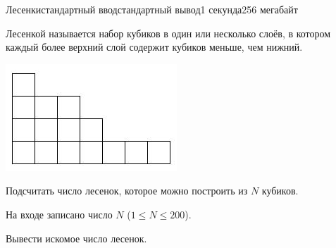 \begin{problem}{Лесенки}{стандартный ввод}{стандартный вывод}{1 секунда}{256 мегабайт}

Лесенкой называется набор кубиков в один или несколько слоёв, в котором
каждый более верхний слой содержит кубиков меньше, чем нижний.

\includegraphics[scale=1,natwidth=243, natheight=152]{lesenki_image_ru_1.jpg}

Подсчитать число лесенок, которое можно построить из $N$ кубиков.


\InputFile
На входе записано число $N$ ($1 \le N \le 200$).


\OutputFile
Вывести искомое число лесенок.

\Example

\begin{example}
%
\end{example}

\end{problem}

